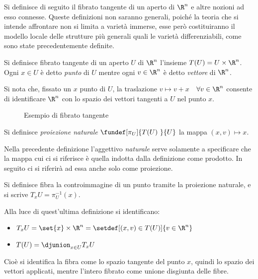 

Si definisce di seguito il fibrato tangente di un aperto di $\R ^n$ e altre nozioni ad esso connesse.
Queste definizioni non saranno generali, poiché la teoria che si intende affrontare non si limita a varietà immerse, esse però costituiranno il modello locale delle strutture più generali quali le varietà differenziabili, come sono state precedentemente definite.

\begin{defn}
Si definisce fibrato tangente di un aperto $U$ di $\R ^n$ l'insieme $T(U) = U \times \R ^n$. Ogni $x\in U$ è detto \emph{punto} di $U$ mentre ogni $v\in \R ^n$ è detto \emph{vettore} di $\R ^n$.
\end{defn}

Si nota che, fissato un $x$ punto di $U$, la traslazione $v \mapsto v + x$~~$\forall v\in \R ^n$  consente di identificare $\R ^n$ con lo spazio dei vettori tangenti a $U$ nel punto $x$.

\begin{figure}[b]
\centering

\caption{Esempio di fibrato tangente}
\end{figure}


\begin{defn}
Si definisce \emph{proiezione naturale} $\fundef[\pi _U]{T(U)~}{U}$ la mappa $(x,v) \mapsto x$.
\end{defn}

Nella precedente definizione l'aggettivo \emph{naturale} serve solamente a specificare che la mappa cui ci si riferisce è quella indotta dalla definizione come prodotto. In seguito ci si riferirà ad essa anche solo come proiezione.

\begin{defn}[Fibra]
Si definisce fibra la controimmagine di un punto tramite la proiezione naturale, e si scrive $T_x U = \pi ^{-1} _U (x)$.
\end{defn}

Alla luce di quest'ultima definizione si identificano:
\begin{itemize}
\item $T_x U = \set{x} \times \R ^n = \setdef[(x,v)\in T(U)]{v \in \R^n}$
\item $T(U) = \djunion_{x \in U} T_x U$
\end{itemize}
Cioè si identifica la fibra come lo spazio tangente del punto $x$, quindi lo spazio dei vettori applicati, mentre l'intero fibrato come unione disgiunta delle fibre.

